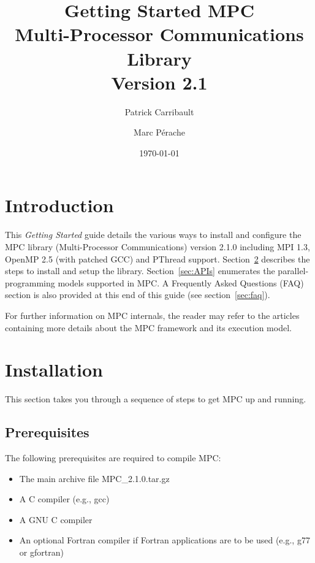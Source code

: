 \documentclass[a4paper,11pt]{article}
\title{Getting Started MPC\\Multi-Processor Communications Library\\Version 2.1}
\author{Patrick Carribault \and Marc P\'{e}rache}
\date{\today}
\def\MPCVERSION{2.1.0}
\begin{document}
\maketitle
\tableofcontents

\section{Introduction}
This \textit{Getting Started} guide details the various ways to install and configure the MPC library
(Multi-Processor Communications) version {\MPCVERSION} including MPI 1.3, OpenMP 2.5 (with patched GCC) and PThread support.
Section~\ref{sec:installation} describes the steps to install and setup the library.
Section~\ref{sec:APIs} enumerates the parallel-programming models supported in MPC.
A Frequently Asked Questions (FAQ) section is also provided at this end of this guide (see section~\ref{sec:faq}).

For further information on MPC internals, the reader may refer to the
articles~\cite{Perache08,Perache09,Carribault10} containing more details about the MPC
framework and its execution model.

\section{Installation}
\label{sec:installation}

This section takes you through a sequence of steps to get MPC up and running.

\subsection{Prerequisites}

The following prerequisites are required to compile MPC:
\begin{itemize}
    \item  The main archive file MPC\_\MPCVERSION.tar.gz

    \item  A C compiler (e.g., gcc)

    \item  A GNU C compiler

    \item  An optional Fortran compiler if Fortran applications are to be used
      (e.g., g77 or gfortran)
\end{itemize}
\end{document}
